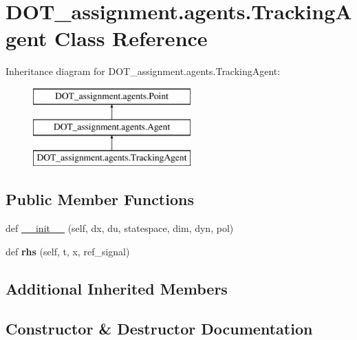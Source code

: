 \hypertarget{class_d_o_t__assignment_1_1agents_1_1_tracking_agent}{}\section{D\+O\+T\+\_\+assignment.\+agents.\+Tracking\+Agent Class Reference}
\label{class_d_o_t__assignment_1_1agents_1_1_tracking_agent}
Inheritance diagram for D\+O\+T\+\_\+assignment.\+agents.\+Tracking\+Agent\+:\begin{figure}[H]
\begin{center}
\leavevmode
\includegraphics[height=3.000000cm]{class_d_o_t__assignment_1_1agents_1_1_tracking_agent}
\end{center}
\end{figure}
\subsection*{Public Member Functions}
\begin{DoxyCompactItemize}
\item 
def \mbox{\hyperlink{class_d_o_t__assignment_1_1agents_1_1_tracking_agent_a8176e047211a3a386c4617f35fbf9d88}{\+\_\+\+\_\+init\+\_\+\+\_\+}} (self, dx, du, statespace, dim, dyn, pol)
\item 
\mbox{\label{class_d_o_t__assignment_1_1agents_1_1_tracking_agent_a792dde7a31d3dd4f2ed33473d6946b7e}} 
def {\bfseries rhs} (self, t, x, ref\+\_\+signal)
\end{DoxyCompactItemize}
\subsection*{Additional Inherited Members}


\subsection{Constructor \& Destructor Documentation}
\mbox{\label{class_d_o_t__assignment_1_1agents_1_1_tracking_agent_a8176e047211a3a386c4617f35fbf9d88}} 
